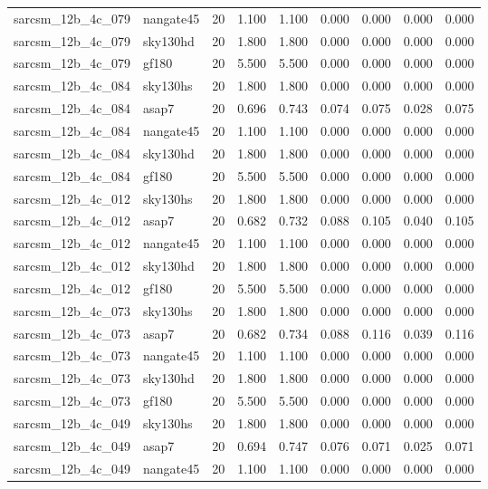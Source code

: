 \begin{tabular}{llrrrrrrr}
sarcsm\_12b\_4c\_079 & nangate45 & 20 & 1.100 & 1.100 & 0.000 & 0.000 & 0.000 & 0.000 \\
sarcsm\_12b\_4c\_079 & sky130hd & 20 & 1.800 & 1.800 & 0.000 & 0.000 & 0.000 & 0.000 \\
sarcsm\_12b\_4c\_079 & gf180 & 20 & 5.500 & 5.500 & 0.000 & 0.000 & 0.000 & 0.000 \\
sarcsm\_12b\_4c\_084 & sky130hs & 20 & 1.800 & 1.800 & 0.000 & 0.000 & 0.000 & 0.000 \\
sarcsm\_12b\_4c\_084 & asap7 & 20 & 0.696 & 0.743 & 0.074 & 0.075 & 0.028 & 0.075 \\
sarcsm\_12b\_4c\_084 & nangate45 & 20 & 1.100 & 1.100 & 0.000 & 0.000 & 0.000 & 0.000 \\
sarcsm\_12b\_4c\_084 & sky130hd & 20 & 1.800 & 1.800 & 0.000 & 0.000 & 0.000 & 0.000 \\
sarcsm\_12b\_4c\_084 & gf180 & 20 & 5.500 & 5.500 & 0.000 & 0.000 & 0.000 & 0.000 \\
sarcsm\_12b\_4c\_012 & sky130hs & 20 & 1.800 & 1.800 & 0.000 & 0.000 & 0.000 & 0.000 \\
sarcsm\_12b\_4c\_012 & asap7 & 20 & 0.682 & 0.732 & 0.088 & 0.105 & 0.040 & 0.105 \\
sarcsm\_12b\_4c\_012 & nangate45 & 20 & 1.100 & 1.100 & 0.000 & 0.000 & 0.000 & 0.000 \\
sarcsm\_12b\_4c\_012 & sky130hd & 20 & 1.800 & 1.800 & 0.000 & 0.000 & 0.000 & 0.000 \\
sarcsm\_12b\_4c\_012 & gf180 & 20 & 5.500 & 5.500 & 0.000 & 0.000 & 0.000 & 0.000 \\
sarcsm\_12b\_4c\_073 & sky130hs & 20 & 1.800 & 1.800 & 0.000 & 0.000 & 0.000 & 0.000 \\
sarcsm\_12b\_4c\_073 & asap7 & 20 & 0.682 & 0.734 & 0.088 & 0.116 & 0.039 & 0.116 \\
sarcsm\_12b\_4c\_073 & nangate45 & 20 & 1.100 & 1.100 & 0.000 & 0.000 & 0.000 & 0.000 \\
sarcsm\_12b\_4c\_073 & sky130hd & 20 & 1.800 & 1.800 & 0.000 & 0.000 & 0.000 & 0.000 \\
sarcsm\_12b\_4c\_073 & gf180 & 20 & 5.500 & 5.500 & 0.000 & 0.000 & 0.000 & 0.000 \\
sarcsm\_12b\_4c\_049 & sky130hs & 20 & 1.800 & 1.800 & 0.000 & 0.000 & 0.000 & 0.000 \\
sarcsm\_12b\_4c\_049 & asap7 & 20 & 0.694 & 0.747 & 0.076 & 0.071 & 0.025 & 0.071 \\
sarcsm\_12b\_4c\_049 & nangate45 & 20 & 1.100 & 1.100 & 0.000 & 0.000 & 0.000 & 0.000 \\

\end{tabular}
